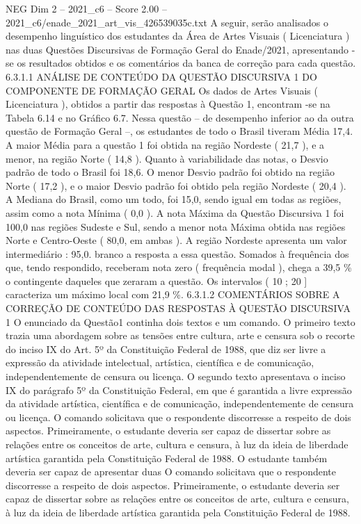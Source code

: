 \begin{textsample}{NEG Dim 2 – 2021\_c6 – Score 2.00 – 2021\_c6/enade\_2021\_art\_vis\_426539035c.txt}
A seguir, serão analisados o desempenho linguístico dos estudantes da Área de Artes Visuais ( Licenciatura ) nas duas Questões Discursivas de Formação Geral do Enade/2021, apresentando -se os resultados obtidos e os comentários da banca de correção para cada questão. 6.3.1.1 ANÁLISE DE CONTEÚDO DA QUESTÃO DISCURSIVA 1 DO COMPONENTE DE FORMAÇÃO GERAL Os dados de Artes Visuais ( Licenciatura ), obtidos a partir das respostas à Questão 1, encontram -se na Tabela 6.14 e no Gráfico 6.7.
Nessa questão – de desempenho inferior ao da outra questão de Formação Geral –, os estudantes de todo o Brasil tiveram Média 17,4.
A maior Média para a questão 1 foi obtida na região Nordeste ( 21,7 ), e a menor, na região Norte ( 14,8 ).
Quanto à variabilidade das notas, o Desvio padrão de todo o Brasil foi 18,6.
O menor Desvio padrão foi obtido na região Norte ( 17,2 ), e o maior Desvio padrão foi obtido pela região Nordeste ( 20,4 ).
A Mediana do Brasil, como um todo, foi 15,0, sendo igual em todas as regiões, assim como a nota Mínima ( 0,0 ).
A nota Máxima da Questão Discursiva 1 foi 100,0 nas regiões Sudeste e Sul, sendo a menor nota Máxima obtida nas regiões Norte e Centro-Oeste ( 80,0, em ambas ).
A região Nordeste apresenta um valor intermediário : 95,0. branco a resposta a essa questão.
Somados à frequência dos que, tendo respondido, receberam nota zero ( frequência modal ), chega a 39,5 \% o contingente daqueles que zeraram a questão.
Os intervalos ( 10 ; 20 ] caracteriza um máximo local com 21,9 \%. 6.3.1.2 COMENTÁRIOS SOBRE A CORREÇÃO DE CONTEÚDO DAS RESPOSTAS À QUESTÃO DISCURSIVA 1 O enunciado da Questão1 continha dois textos e um comando.
O primeiro texto trazia uma abordagem sobre as tensões entre cultura, arte e censura sob o recorte do inciso IX do Art. 5º da Constituição Federal de 1988, que diz ser livre a expressão da atividade intelectual, artística, científica e de comunicação, independentemente de censura ou licença.
O segundo texto apresentava o inciso IX do parágrafo 5º da Constituição Federal, em que é garantida a livre expressão da atividade artística, científica e de comunicação, independentemente de censura ou licença.
O comando solicitava que o respondente discorresse a respeito de dois aspectos.
Primeiramente, o estudante deveria ser capaz de dissertar sobre as relações entre os conceitos de arte, cultura e censura, à luz da ideia de liberdade artística garantida pela Constituição Federal de 1988.
O estudante também deveria ser capaz de apresentar duas O comando solicitava que o respondente discorresse a respeito de dois aspectos.
Primeiramente, o estudante deveria ser capaz de dissertar sobre as relações entre os conceitos de arte, cultura e censura, à luz da ideia de liberdade artística garantida pela Constituição Federal de 1988.

\end{textsample}
